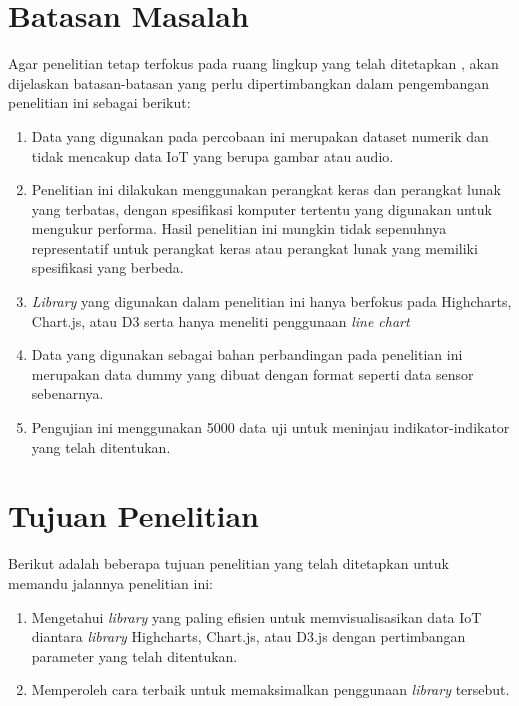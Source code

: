 \section{Batasan Masalah}
Agar penelitian tetap terfokus pada ruang lingkup yang telah ditetapkan \cite{muhammadred}, akan dijelaskan batasan-batasan yang perlu dipertimbangkan dalam pengembangan penelitian ini sebagai berikut:
\begin{enumerate}
    \item Data yang digunakan pada percobaan ini merupakan dataset numerik dan tidak mencakup data IoT yang berupa gambar atau audio. 
    \item Penelitian ini dilakukan menggunakan perangkat keras dan perangkat lunak yang terbatas, dengan spesifikasi komputer tertentu yang digunakan untuk mengukur performa. Hasil penelitian ini mungkin tidak sepenuhnya representatif untuk perangkat keras atau perangkat lunak yang memiliki spesifikasi yang berbeda.
    \item \textit{Library} yang digunakan dalam penelitian ini hanya berfokus pada Highcharts, Chart.js, atau D3 serta hanya meneliti penggunaan \textit{line chart}
    \item Data yang digunakan sebagai bahan perbandingan pada penelitian ini merupakan data dummy yang dibuat dengan format seperti data sensor sebenarnya.
    \item Pengujian ini menggunakan 5000 data uji untuk meninjau indikator-indikator yang telah ditentukan. 
\end{enumerate}

\section{Tujuan Penelitian}
Berikut adalah beberapa tujuan penelitian yang telah ditetapkan untuk memandu jalannya penelitian ini: 
\begin{enumerate}
    \item Mengetahui \textit{library} yang paling efisien untuk memvisualisasikan data IoT diantara \textit{library} Highcharts, Chart.js, atau D3.js dengan pertimbangan parameter yang telah ditentukan.
    \item Memperoleh cara terbaik untuk memaksimalkan penggunaan \textit{library} tersebut.
\end{enumerate}

